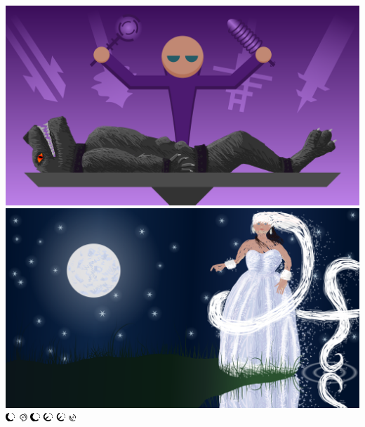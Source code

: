 \documentclass[a4paper,12pt]{book}
\begin{document}
\includegraphics[width=\textwidth]{./img/werewolf.png}
\clearpage%
\includegraphics[width=\textwidth]{./img/tort.png}
\clearpage%
\includegraphics[height=0.9em]{./chars/kula.pdf}
\clearpage%
\includegraphics[height=0.9em]{./chars/monster.pdf}
\clearpage%
\includegraphics[height=0.9em]{./chars/kula.pdf}
\clearpage%
\includegraphics[height=0.9em]{./chars/profesor.pdf}
\clearpage%
\includegraphics[height=0.9em]{./chars/profesor.pdf}
\clearpage%
\includegraphics[height=0.9em]{./chars/monster_language.pdf}
\clearpage%
\end{document}
